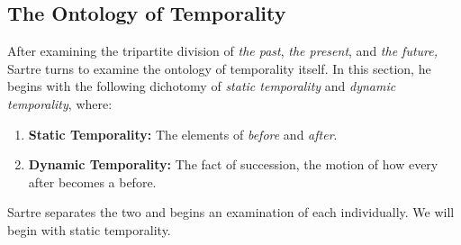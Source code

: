 \subsection{The Ontology of Temporality}

After examining the tripartite division of \emph{the past}, \emph{the present}, and \emph{the future,} Sartre turns to examine the ontology of temporality itself. In this section, he begins with the following dichotomy of \emph{static temporality} and \emph{dynamic temporality}, where:

\begin{enumerate}
    \item \textbf{Static Temporality:} The elements of \emph{before} and \emph{after}.


    \item \textbf{Dynamic Temporality:} The fact of succession, the motion of how every after becomes a before.

\end{enumerate}

\noindent
Sartre separates the two and begins an examination of each individually. We will begin with static temporality.


